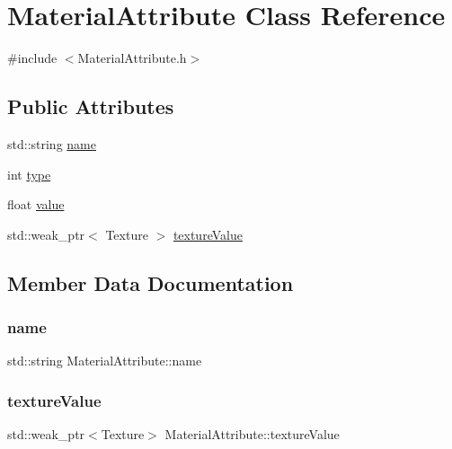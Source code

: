 \hypertarget{class_material_attribute}{}\section{Material\+Attribute Class Reference}
\label{class_material_attribute}


{\ttfamily \#include $<$Material\+Attribute.\+h$>$}

\subsection*{Public Attributes}
\begin{DoxyCompactItemize}
\item 
std\+::string \hyperlink{class_material_attribute_a70376e8640343b8b0934424368819d37}{name}
\item 
int \hyperlink{class_material_attribute_af4f42692f645b1d01c3605a95c4eb42d}{type}
\item 
float \hyperlink{class_material_attribute_aa9dd014cb716d0270347167bee75cc75}{value}
\item 
std\+::weak\+\_\+ptr$<$ Texture $>$ \hyperlink{class_material_attribute_a75f91e0d2d9acde9a6f53a1109fa8250}{texture\+Value}
\end{DoxyCompactItemize}


\subsection{Member Data Documentation}
\mbox{\label{class_material_attribute_a70376e8640343b8b0934424368819d37}} 
\subsubsection{\texorpdfstring{name}{name}}
{\footnotesize\ttfamily std\+::string Material\+Attribute\+::name}

\mbox{\label{class_material_attribute_a75f91e0d2d9acde9a6f53a1109fa8250}} 
\subsubsection{\texorpdfstring{texture\+Value}{textureValue}}
{\footnotesize\ttfamily std\+::weak\+\_\+ptr$<$Texture$>$ Material\+Attribute\+::texture\+Value}

